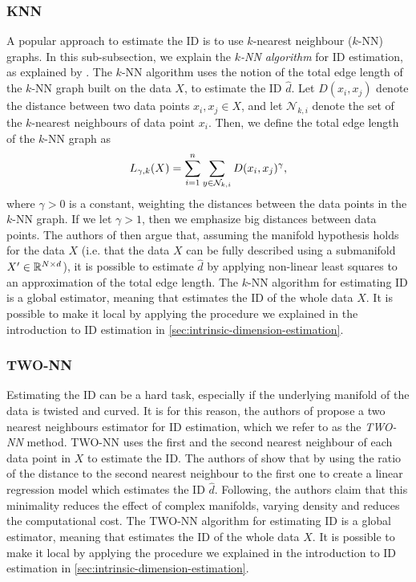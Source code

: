 \subsubsection{KNN}
\label{sec:id-estimation-knn}
A popular approach to estimate the ID is to use $k$-nearest neighbour ($k$-NN) graphs. In this sub-subsection, we explain the \textit{$k$-NN algorithm} for ID estimation, as explained by \cite[p. 651]{Carter2010}. The $k$-NN algorithm uses the notion of the total edge length of the $k$-NN graph built on the data $X$, to estimate the ID $\hat{d}$. Let $D(x_i, x_j)$ denote the distance between two data points $x_i, x_j \in X$, and let $\mathcal{N}_{k, i}$ denote the set of the $k$-nearest neighbours of data point $x_i$. Then, we define the total edge length of the $k$-NN graph as
\begin{align}
    L_{\gamma, k}(X) = \sum\limits_{i=1}^{n} \sum\limits_{y \in \mathcal{N}_{k, i}}^{} D(x_i, x_j)^\gamma,
    \label{eqn:k-nn-id-estimation-l}
\end{align}
where $\gamma>0$ is a constant, weighting the distances between the data points in the $k$-NN graph. If we let $\gamma>1$, then we emphasize big distances between data points. The authors of \cite[p. 651]{Carter2010} then argue that, assuming the manifold hypothesis holds for the data $X$ (i.e. that the data $X$ can be fully described using a submanifold $X' \in \mathbb{R}^{N \times d}$), it is possible to estimate $\hat{d}$ by applying non-linear least squares to an approximation of the total edge length. The $k$-NN algorithm for estimating ID is a global estimator, meaning that estimates the ID of the whole data $X$. It is possible to make it local by applying the procedure we explained in the introduction to ID estimation in \cref{sec:intrinsic-dimension-estimation}.

\subsubsection{TWO-NN}
\label{sec:id-estimation-twonn}
Estimating the ID can be a hard task, especially if the underlying manifold of the data is twisted and curved. It is for this reason, the authors of \cite{Facco2017twonn} propose a two nearest neighbours estimator for ID estimation, which we refer to as the \textit{TWO-NN} method. TWO-NN uses the first and the second nearest neighbour of each data point in $X$ to estimate the ID. The authors of \cite{Facco2017twonn} show that by using the ratio of the distance to the second nearest neighbour to the first one to create a linear regression model which estimates the ID $\hat{d}$. Following, the authors claim that this minimality reduces the effect of complex manifolds, varying density and reduces the computational cost. The TWO-NN algorithm for estimating ID is a global estimator, meaning that estimates the ID of the whole data $X$. It is possible to make it local by applying the procedure we explained in the introduction to ID estimation in \cref{sec:intrinsic-dimension-estimation}.

